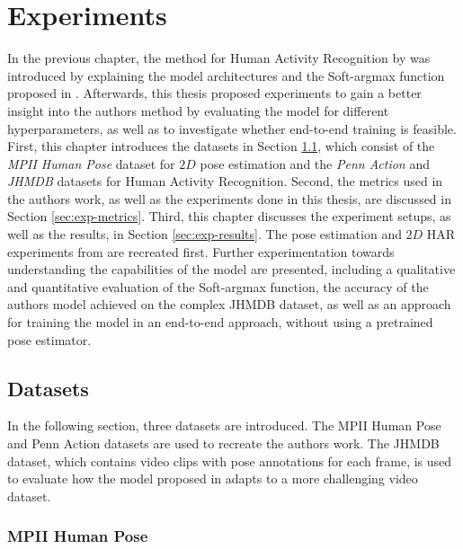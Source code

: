 \chapter{Experiments}
\label{sec:chapter5}
In the previous chapter, the method for Human Activity Recognition by \cite{luvizon_2d/3d_2018} was introduced by explaining the model architectures and the Soft-argmax function proposed in \cite{luvizon_human_2017}.
Afterwards, this thesis proposed experiments to gain a better insight into the authors method by evaluating the model for different hyperparameters, as well as to investigate whether end-to-end training is feasible.
First, this chapter introduces the datasets in Section \ref{sec:exp-datasets}, which consist of the \textit{MPII Human Pose} dataset for $2D$ pose estimation and the \textit{Penn Action} and \textit{JHMDB} datasets for Human Activity Recognition.
Second, the metrics used in the authors work, as well as the experiments done in this thesis, are discussed in Section \ref{sec:exp-metrics}.
Third, this chapter discusses the experiment setups, as well as the results, in Section \ref{sec:exp-results}.
The pose estimation and $2D$ HAR experiments from \cite{luvizon_2d/3d_2018} are recreated first.
Further experimentation towards understanding the capabilities of the model are presented, including a qualitative and quantitative evaluation of the Soft-argmax function, the accuracy of the authors model achieved on the complex JHMDB dataset, as well as an approach for training the model in an end-to-end approach, without using a pretrained pose estimator.

\section{Datasets}
\label{sec:exp-datasets}
In the following section, three datasets are introduced.
The MPII Human Pose and Penn Action datasets are used to recreate the authors work.
The JHMDB dataset, which contains video clips with pose annotations for each frame, is used to evaluate how the model proposed in \cite{luvizon_2d/3d_2018} adapts to a more challenging video dataset.

\subsection{MPII Human Pose}
\label{sec:exp-mpii}

